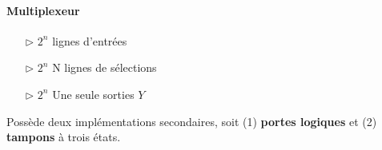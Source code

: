 \documentclass{report}
\begin{document}
\begin{multicols*}{3}
    \paragraph{Multiplexeur}
    \begin{itemize}
        \item[$\rhd$]  $2^n$ lignes d'entrées 
        \item[$\rhd$]  $2^n$ N lignes de sélections 
        \item[$\rhd$]  $2^n$ Une seule sorties $Y$  
    \end{itemize}
    Possède deux implémentations secondaires, soit (1) \textbf{portes logiques}
    et (2) \textbf{tampons} à trois états. 
    \end{multicols*}
\end{document}
